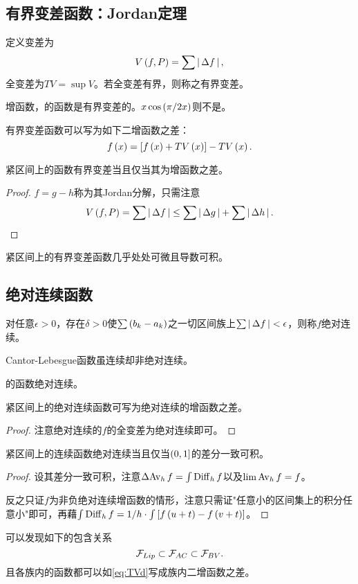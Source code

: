\documentclass{ctexrep}
\begin{document}
  \subsection{有界变差函数：Jordan定理}
  \begin{definition}
    定义变差为
    \[ V\left(f,P\right) = \sum \left|\, \Delta f \,\right|, \]
    全变差为$TV = \sup V$。若全变差有界，则称之有界变差。
  \end{definition}
  \begin{ex}
    增函数，的函数是有界变差的。$x\cos\left(\pi/2x\right)$则不是。
  \end{ex}
  \begin{lemma}
    有界变差函数可以写为如下二增函数之差：
    \begin{equation}
      \label{eq:TVd}
      f\left(x\right) = \left[f\left(x\right) + TV\left(x\right)\right] - TV\left(x\right).
    \end{equation}
  \end{lemma}
  \begin{theorem}[Jordan]
    紧区间上的函数有界变差当且仅当其为增函数之差。
  \end{theorem}
  \begin{proof}
    $f=g-h$称为其Jordan分解，只需注意
    \[ V\left(f,P\right) = \sum \left|\, \Delta f \,\right| \le \sum \left|\, \Delta g \,\right| + \sum \left|\, \Delta h \,\right|. \qedhere \]
  \end{proof}
  \begin{collary}
    紧区间上的有界变差函数几乎处处可微且导数可积。
  \end{collary}
  \subsection{绝对连续函数}
  \begin{definition}
    对任意$\epsilon>0$，存在$\delta>0$使$\sum \left(b_k-a_k\right)$之一切区间族上$\sum \left|\, \Delta f \,\right| < \epsilon$，则称$f$绝对连续。
  \end{definition}
  \begin{ex}
    Cantor-Lebesgue函数虽连续却非绝对连续。
  \end{ex}
  \begin{proposition}
    的函数绝对连续。
  \end{proposition}
  \begin{theorem}
    紧区间上的绝对连续函数可写为绝对连续的增函数之差。
  \end{theorem}
  \begin{proof}
    注意绝对连续的$f$的全变差为绝对连续即可。
  \end{proof}
  \begin{theorem}
    \label{thm:abs2unint}
    紧区间上的连续函数绝对连续当且仅当$\left(0,1\right]$的差分一致可积。
  \end{theorem}
  \begin{proof}
    设其差分一致可积，注意$\Delta \mathrm{Av}_{h}\,f = \int \mathrm{Diff}_{h}\, f$以及$\lim \mathrm{Av}_{h}\, f = f$。\par
    反之只证$f$为非负绝对连续增函数的情形，注意只需证"任意小的区间集上的积分任意小"即可，再藉$\int \mathrm{Diff}_{h}\,f = 1/h\cdot\int \left[f\left(u+t\right)-f\left(v+t\right)\right]$。
  \end{proof}
  可以发现如下的包含关系
  \[ \mathcal{F}_{Lip} \subset \mathcal{F}_{AC} \subset \mathcal{F}_{BV}. \]
  且各族内的函数都可以如\eqref{eq:TVd}写成族内二增函数之差。
\end{document}
